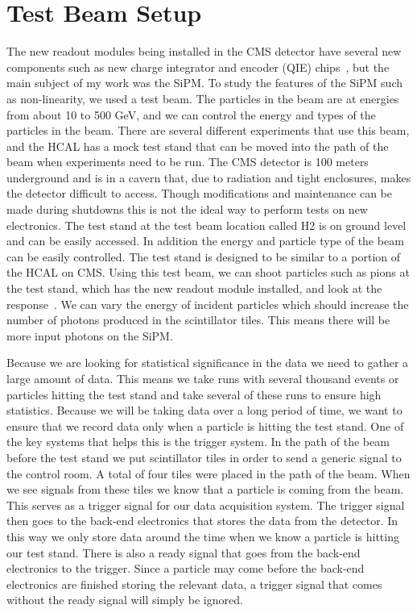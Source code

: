 \section{Test Beam Setup}


The new readout modules being installed in the CMS detector have several new components such as new charge integrator and encoder (QIE) chips~\cite{QIE, QIE2}, but the main subject of my work was the SiPM. To study the features of the SiPM such as non-linearity, we used a test beam. The particles in the beam are at energies from about 10 to 500 GeV, and we can control the energy and types of the particles in the beam. There are several different experiments that use this beam, and the HCAL has a mock test stand that can be moved into the path of the beam when experiments need to be run. The CMS detector is 100 meters underground and is in a cavern that, due to radiation and tight enclosures, makes the detector difficult to access. Though modifications and maintenance can be made during shutdowns this is not the ideal way to perform tests on new electronics. The test stand at the test beam location called H2 is on ground level and can be easily accessed. In addition the energy and particle type of the beam can be easily controlled. The test stand is designed to be similar to a portion of the HCAL on CMS. Using this test beam, we can shoot particles such as pions at the test stand, which has the new readout module installed, and look at the response~\cite{TB96, TB06}. We can vary the energy of incident particles which should increase the number of photons produced in the scintillator tiles. This means there will be more input photons on the SiPM.

Because we are looking for statistical significance in the data we need to gather a large amount of data. This means we take runs with several thousand events or particles hitting the test stand and take several of these runs to ensure high statistics. Because we will be taking data over a long period of time, we want to ensure that we record data only when a particle is hitting the test stand. One of the key systems that helps this is the trigger system. In the path of the beam before the test stand we put scintillator tiles in order to send a generic signal to the control room. A total of four tiles were placed in the path of the beam. When we see signals from these tiles we know that a particle is coming from the beam. This serves as a trigger signal for our data acquisition system. The trigger signal then goes to the back-end electronics that stores the data from the detector. In this way we only store data around the time when we know a particle is hitting our test stand. There is also a ready signal that goes from the back-end electronics to the trigger. Since a particle may come before the back-end electronics are finished storing the relevant data, a trigger signal that comes without the ready signal will simply be ignored.

